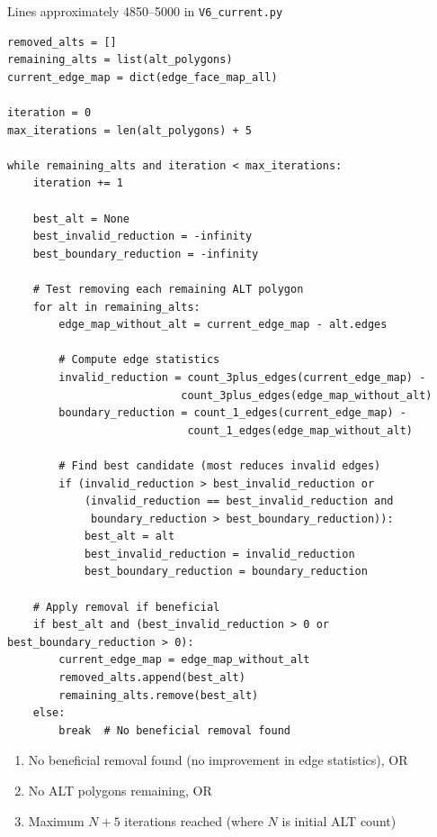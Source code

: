 Lines approximately 4850--5000 in \texttt{V6\_current.py}

\begin{lstlisting}
removed_alts = []
remaining_alts = list(alt_polygons)
current_edge_map = dict(edge_face_map_all)

iteration = 0
max_iterations = len(alt_polygons) + 5

while remaining_alts and iteration < max_iterations:
    iteration += 1
    
    best_alt = None
    best_invalid_reduction = -infinity
    best_boundary_reduction = -infinity
    
    # Test removing each remaining ALT polygon
    for alt in remaining_alts:
        edge_map_without_alt = current_edge_map - alt.edges
        
        # Compute edge statistics
        invalid_reduction = count_3plus_edges(current_edge_map) - 
                           count_3plus_edges(edge_map_without_alt)
        boundary_reduction = count_1_edges(current_edge_map) - 
                            count_1_edges(edge_map_without_alt)
        
        # Find best candidate (most reduces invalid edges)
        if (invalid_reduction > best_invalid_reduction or
            (invalid_reduction == best_invalid_reduction and
             boundary_reduction > best_boundary_reduction)):
            best_alt = alt
            best_invalid_reduction = invalid_reduction
            best_boundary_reduction = boundary_reduction
    
    # Apply removal if beneficial
    if best_alt and (best_invalid_reduction > 0 or best_boundary_reduction > 0):
        current_edge_map = edge_map_without_alt
        removed_alts.append(best_alt)
        remaining_alts.remove(best_alt)
    else:
        break  # No beneficial removal found
\end{lstlisting}

\begin{enumerate}
    \item No beneficial removal found (no improvement in edge statistics), OR
    \item No ALT polygons remaining, OR
    \item Maximum $N + 5$ iterations reached (where $N$ is initial ALT count)
\end{enumerate}

